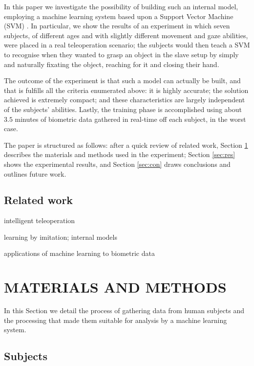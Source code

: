 \documentclass[a4paper,10pt,conference]{ieeeconf}
\begin{document}
In this paper we investigate the possibility of building such an
internal model, employing a machine learning system based upon a
Support Vector Machine (SVM) \cite{BGV92}. In particular, we show the
results of an experiment in which seven subjects, of different ages
and with slightly different movement and gaze abilities, were placed
in a real teleoperation scenario; the subjects would then teach a SVM
to recognise when they wanted to grasp an object in the slave setup by
simply and naturally fixating the object, reaching for it and closing
their hand.

The outcome of the experiment is that such a model can actually be
built, and that is fulfills all the criteria enumerated above: it is
highly accurate; the solution achieved is extremely compact; and these
characteristics are largely independent of the subjects'
abilities. Lastly, the training phase is accomplished using about
$3.5$ minutes of biometric data gathered in real-time off each
subject, in the worst case.

The paper is structured as follows: after a quick review of related
work, Section \ref{sec:mat} describes the materials and methods used
in the experiment; Section \ref{sec:res} shows the experimental
results, and Section \ref{sec:con} draws conclusions and outlines
future work.

\subsection{Related work}

intelligent teleoperation

learning by imitation; internal models

applications of machine learning to biometric data

\section{MATERIALS AND METHODS}
\label{sec:mat}

In this Section we detail the process of gathering data from human
subjects and the processing that made them suitable for analysis by a
machine learning system.

\subsection{Subjects}
\end{document}

